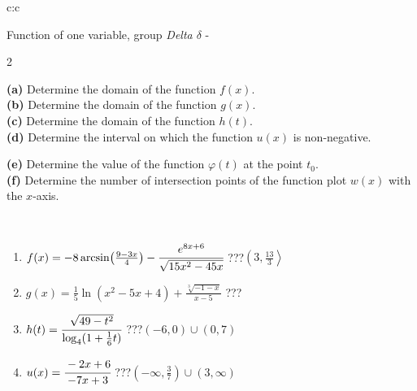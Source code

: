 \documentclass[10pt]{report}
\begin{document}
\begin{tabular}{c:c}
\begin{minipage}[c][104.5mm][t]{0.5\linewidth}
\begin{center}
\vspace{7mm}
{\huge Function of one variable, group \textit{Delta $\delta$} -}\\[5mm]
\begin{minipage}{0.95\linewidth}
\begin{center}
{\small \begin{multicols}{2} \raggedright
\textbf{(a)} Determine the domain of the function \(f(x)\). \\[1mm]
\textbf{(b)} Determine the domain of the function \(g(x)\). \\[1mm]
\textbf{(c)} Determine the domain of the function \(h(t)\). \\[1mm]
\textbf{(d)} Determine the interval on which the function \(u(x)\) is non-negative. \par \columnbreak
\textbf{(e)} Determine the value of the function \(\varphi(t)\) at the point \(t_0\). \\[1mm]
\textbf{(f)} Determine the number of intersection points of the function plot \(w(x)\) with the \(x\)-axis. \\[1mm]
\end{multicols}
}
\end{center}
\end{minipage}
\\[4mm]
\begin{minipage}{0.79\linewidth}
\begin{center}
\begin{varwidth}{\linewidth}
\begin{enumerate}
\small
\item $f(x) = -8\arcsin\!\left( \frac{9-3x}{4} \right) - \cfrac{e^{8x+6}}{\sqrt{15x^2-45x}}$\quad \dotfill\; ???\;\dotfill \quad $\left(3 , \frac{13}{3}\right\rangle$
\item $g(x) = \frac{1}{5} \ln{\!(x^2-5x+4)}+\frac{\sqrt[3]{-1-x}}{x-5}$\quad \dotfill\; ???\;\dotfill {}
\item $h(t) = \cfrac{\sqrt{49-t^2}}{\log_4(1+\frac{1}{6}t)}$\quad \dotfill\; ???\;\dotfill \quad $\left(-6 , 0\right)\cup\left(0 , 7\right)$
\item $u(x) = \cfrac{-2x+6}{-7x+3}$\quad \dotfill\; ???\;\dotfill \quad $\left(-\infty , \frac{3}{7}\right)\cup\left(3 , \infty\right)$

\end{enumerate}
\end{varwidth}
\end{center}
\end{minipage}
\end{center}
\end{minipage}
\end{tabular}
\end{document}
